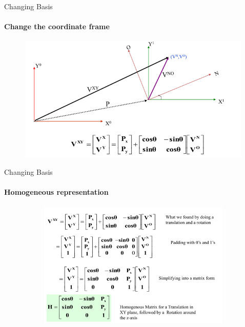 \documentclass[aspectratio=169]{beamer}
\begin{document}
\begin{frame}[t]{Changing Basis}
    \framesubtitle{Change the coordinate frame}
    \vspace{-0.6cm}
    \begin{figure}[H]
        \centering\includegraphics[height=6cm,width=1\textwidth,keepaspectratio]{change_klimchik_1.png}
        \label{fig:change_klimchik_1.png}
    \end{figure}
\end{frame}

\begin{frame}[t]{Changing Basis}
    \framesubtitle{Homogeneous representation}
    \vspace{-0.6cm}
    \begin{figure}[H]
        \centering\includegraphics[height=6cm,width=1\textwidth,keepaspectratio]{change_klimchik_2.png}
        \label{fig:change_klimchik_2.png}
    \end{figure}
\end{frame}
\end{document}
